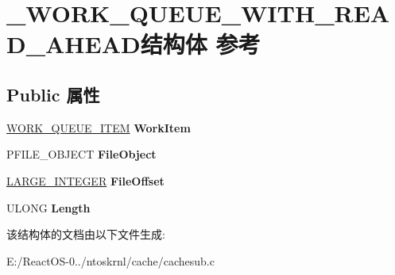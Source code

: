\hypertarget{struct___w_o_r_k___q_u_e_u_e___w_i_t_h___r_e_a_d___a_h_e_a_d}{}\section{\+\_\+\+W\+O\+R\+K\+\_\+\+Q\+U\+E\+U\+E\+\_\+\+W\+I\+T\+H\+\_\+\+R\+E\+A\+D\+\_\+\+A\+H\+E\+A\+D结构体 参考}
\label{struct___w_o_r_k___q_u_e_u_e___w_i_t_h___r_e_a_d___a_h_e_a_d}
\subsection*{Public 属性}
\begin{DoxyCompactItemize}
\item 
\mbox{\label{struct___w_o_r_k___q_u_e_u_e___w_i_t_h___r_e_a_d___a_h_e_a_d_a1124935a0c63aee6ce71411620b32d75}} 
\hyperlink{struct___w_o_r_k___q_u_e_u_e___i_t_e_m}{W\+O\+R\+K\+\_\+\+Q\+U\+E\+U\+E\+\_\+\+I\+T\+EM} {\bfseries Work\+Item}
\item 
\mbox{\label{struct___w_o_r_k___q_u_e_u_e___w_i_t_h___r_e_a_d___a_h_e_a_d_adaef7c0f85c4bf8dc621dc432fe9aa96}} 
P\+F\+I\+L\+E\+\_\+\+O\+B\+J\+E\+CT {\bfseries File\+Object}
\item 
\mbox{\label{struct___w_o_r_k___q_u_e_u_e___w_i_t_h___r_e_a_d___a_h_e_a_d_a3244c3657e54fe0991807e4b2fa4f2aa}} 
\hyperlink{union___l_a_r_g_e___i_n_t_e_g_e_r}{L\+A\+R\+G\+E\+\_\+\+I\+N\+T\+E\+G\+ER} {\bfseries File\+Offset}
\item 
\mbox{\label{struct___w_o_r_k___q_u_e_u_e___w_i_t_h___r_e_a_d___a_h_e_a_d_ad62ea5543dccdebed2f8d085700355c0}} 
U\+L\+O\+NG {\bfseries Length}
\end{DoxyCompactItemize}


该结构体的文档由以下文件生成\+:\begin{DoxyCompactItemize}
\item 
E\+:/\+React\+O\+S-\/0../ntoskrnl/cache/cachesub.\+c\end{DoxyCompactItemize}
